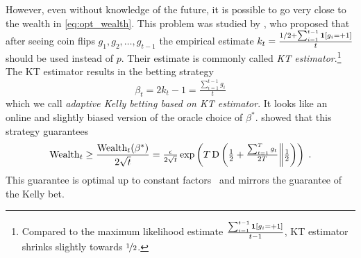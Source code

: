 However, even without knowledge of the future, it is possible to go very close to the wealth in \eqref{eq:opt_wealth}.
This problem was studied by \citet{Krichevsky-Trofimov-1981},
who proposed that after seeing coin flips $g_1, g_2, \dots, g_{t-1}$ the
empirical estimate $k_t = \frac{1/2 + \sum_{i=1}^{t-1} \mathbf{1}[g_i = +1]}{t}$
should be used instead of $p$. Their estimate is commonly called \emph{KT
estimator}.\footnote{Compared to the maximum likelihood estimate
$\frac{\sum_{i=1}^{t-1} \mathbf{1}[g_i = +1]}{t-1}$, KT estimator shrinks
slightly towards $\nicefrac{1}{2}$.} The KT estimator results in the betting strategy
\begin{equation}
\label{equation:kt-estimator-betting-strategy}
\beta_t = 2k_t - 1 = \tfrac{\sum_{i=1}^{t-1} g_i}{t}
\end{equation}
which we call \emph{adaptive Kelly betting based on KT estimator}. It looks like an online and slightly biased version of the oracle choice of $\beta^*$.
\citeauthor{Krichevsky-Trofimov-1981} showed that this strategy guarantees
\[
\operatorname{Wealth}_t \ge \frac{\operatorname{Wealth}_t(\beta^*)}{2\sqrt{t}}
= \tfrac{\epsilon}{2\sqrt{t}} \exp\left(T \operatorname{D}\left({\tfrac{1}{2}+\tfrac{\sum_{t=1}^T g_t}{2T}}\middle\|{\tfrac{1}{2}}\right)\right)\; .
\]
This guarantee is optimal up to constant factors~\citep{Cesa-Bianchi-Lugosi-2006} and mirrors the guarantee of
the Kelly bet.


